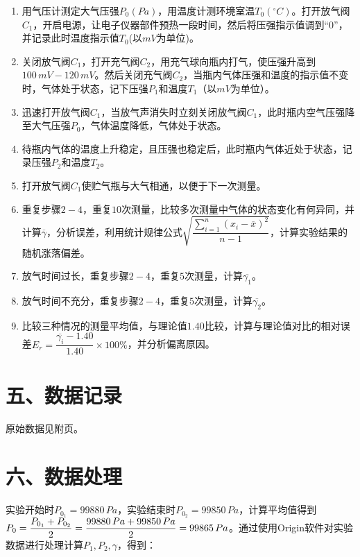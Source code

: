 \documentclass[11pt]{article}
\begin{document}
\begin{enumerate}
    \item 用气压计测定大气压强$P_0(Pa)$，用温度计测环境室温$T_0(^{\circ}C)$。打开放气阀$C_1$，开启电源，让电子仪器部件预热一段时间，然后将压强指示值调到“$0$”，并记录此时温度指示值$T_0$(以$mV$为单位)。
    \item 关闭放气阀$C_1$，打开充气阀$C_2$，用充气球向瓶内打气，使压强升高到$100\,mV-120\,mV$。然后关闭充气阀$C_2$，当瓶内气体压强和温度的指示值不变时，气体处于状态\uppercase\expandafter{}，记下压强$P_1$和温度$T_1$（以$mV$为单位）。
    \item 迅速打开放气阀$C_1$，当放气声消失时立刻关闭放气阀$C_1$，此时瓶内空气压强降至大气压强$P_0$，气体温度降低，气体处于状态\uppercase\expandafter{}。
    \item 待瓶内气体的温度上升稳定，且压强也稳定后，此时瓶内气体近处于状态\uppercase\expandafter{}，记录压强$P_2$和温度$T_2$。
    \item 打开放气阀$C_1$使贮气瓶与大气相通，以便于下一次测量。
    \item 重复步骤$2-4$，重复$10$次测量，比较多次测量中气体的状态变化有何异同，并计算$\overline{\gamma}$，分析误差，利用统计规律公式$\sqrt{\dfrac{\sum_{i=1}^{n}(x_i-\overline{x})^2}{n-1}}$，计算实验结果的随机涨落偏差。
    \item 放气时间过长，重复步骤$2-4$，重复$5$次测量，计算$\overline{\gamma_1}$。
    \item 放气时间不充分，重复步骤$2-4$，重复$5$次测量，计算$\overline{\gamma_2}$。
    \item 比较三种情况的测量平均值，与理论值$1.40$比较，计算与理论值对比的相对误差$E_r=\dfrac{\overline{\gamma_i}-1.40}{1.40}\times100\%$，并分析偏离原因。
\end{enumerate}

\section*{五、数据记录}

原始数据见附页。

\section*{六、数据处理}

实验开始时$P_{0_1}=99880\,Pa$，实验结束时$P_{0_2}=99850\,Pa$，计算平均值得到$P_0=\dfrac{P_{0_1}+P_{0_2}}{2}=\\\dfrac{99880\,Pa+99850\,Pa}{2}=99865\,Pa$。通过使用Origin软件对实验数据进行处理计算$P_1, P_2, \gamma$，得到：
\end{document}
